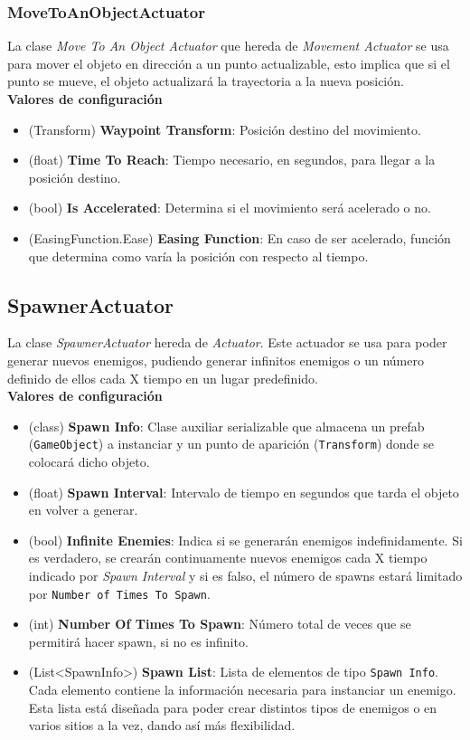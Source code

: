 \subsubsection{MoveToAnObjectActuator}
La clase \textit{Move To An Object Actuator} que hereda de \textit{Movement Actuator} se usa para mover el objeto en dirección a un punto actualizable, esto implica que si el punto se mueve, el objeto actualizará la trayectoria a la nueva posición.\\

\textbf{Valores de configuración}
\begin{itemize} 
	\item (Transform) \textbf{Waypoint Transform}: Posición destino del movimiento.
	\item (float) \textbf{Time To Reach}: Tiempo necesario, en segundos, para llegar a la posición destino.
	\item (bool) \textbf{Is Accelerated}: Determina si el movimiento será acelerado o no.
	\item (EasingFunction.Ease) \textbf{Easing Function}: En caso de ser acelerado, función que determina como varía la posición con respecto al tiempo.
\end{itemize}

\subsection{SpawnerActuator}
La clase \textit{SpawnerActuator} hereda de \textit{Actuator}. Este actuador se usa para poder generar nuevos enemigos, pudiendo generar infinitos enemigos o un número definido de ellos cada X tiempo en un lugar predefinido.\\

\textbf{Valores de configuración}
\begin{itemize}
    \item (class) \textbf{Spawn Info}: Clase auxiliar serializable que almacena un prefab (\texttt{GameObject}) a instanciar y un punto de aparición (\texttt{Transform}) donde se colocará dicho objeto.
    \item (float) \textbf{Spawn Interval}: Intervalo de tiempo en segundos que tarda el objeto en volver a generar. 
    \item (bool) \textbf{Infinite Enemies}: Indica si se generarán enemigos indefinidamente. Si es verdadero, se crearán continuamente nuevos enemigos cada X tiempo indicado por \textit{Spawn Interval} y si es falso, el número de spawns estará limitado por \texttt{Number of Times To Spawn}.
    \item (int) \textbf{Number Of Times To Spawn}: Número total de veces que se permitirá hacer spawn, si no es infinito.
    \item (List<SpawnInfo>) \textbf{Spawn List}: Lista de elementos de tipo \texttt{Spawn Info}. Cada elemento contiene la información necesaria para instanciar un enemigo. Esta lista está diseñada para poder crear distintos tipos de enemigos o en varios sitios a la vez, dando así más flexibilidad.
\end{itemize}


